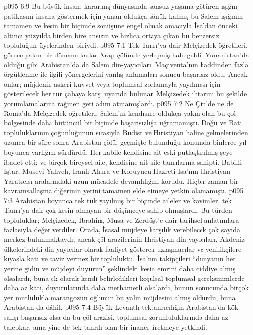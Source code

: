 \vs p095 6:9 Bu büyük insan; kararmış dünyasında sonsuz yaşama götüren ışığın patikasını insana göstermek için yanan oldukça sönük kalmış bu Salem ışığının tamamen ve kesin bir biçimde sönüşüne engel olmak amacıyla İsa’dan önceki altıncı yüzyılda birden bire ansızın ve hızlıca ortaya çıkan bu benzersiz topluluğun üyelerinden biriydi.
\vs p095 7:1 Tek Tanrı’ya dair Melçizedek öğretileri, görece yakın bir döneme kadar Arap çölünde yerleşmiş hale geldi. Yunanistan’da olduğu gibi Arabistan’da da Salem din\hyp{}yayıcıları, Maçiventa’nın haddinden fazla örgütlenme ile ilgili yönergelerini yanlış anlamaları sonucu başarısız oldu. Ancak onlar; müjdenin askeri kuvvet veya toplumsal zorlamayla yayılması için gösterilecek her tür çabaya karşı uyarıda bulunan Melçizedek ihtarını bu şekilde yorumlamalarına rağmen geri adım atmamışlardı.
\vs p095 7:2 Ne Çin’de ne de Roma’da Melçizedek öğretileri, Salem’in kendisine oldukça yakın olan bu çöl bölgesinde daha bütüncül bir biçimde başarısızlığa uğramamıştı. Doğu ve Batı topluluklarının çoğunluğunun sırasıyla Budist ve Hıristiyan haline gelmelerinden uzunca bir süre sonra Arabistan çölü, geçmişte bulunduğu konumda binlerce yıl boyunca varlığını sürdürdü. Her kabile kendisine ait eski putlaştırılmış şeye ibadet etti; ve birçok bireysel aile, kendisine ait aile tanrılarına sahipti. Babilli İştar, Musevi Yahveh, İranlı Ahura ve Koruyucu Hazreti İsa’nın Hıristiyan Yaratıcısı aralarındaki uzun mücadele devamlılığını korudu. Hiçbir zaman bir kavramsallaşma diğerinin yerini tamamen elde etmeye yetkin olamamıştı.
\vs p095 7:3 Arabistan boyunca tek tük yayılmış bir biçimde aileler ve kavimler, tek Tanrı’ya dair çok kesin olmayan bir düşünceye sahip olmuşlardı. Bu türden topluluklar; Melçizedek, İbrahim, Musa ve Zerdüşt’e dair tarihsel anlatımlara fazlasıyla değer verdiler. Orada, İsasal müjdeye karşılık verebilecek çok sayıda merkez bulunmaktaydı; ancak çöl arazilerinin Hıristiyan din\hyp{}yayıcıları, Akdeniz ülkelerindeki din\hyp{}yayıcılar olarak faaliyet gösteren uzlaşmacılar ve yenilikçilere kıyasla katı ve taviz vermez bir topluluktu. İsa’nın takipçileri “dünyanın her yerine gidin ve müjdeyi duyurun” şeklindeki kesin emrini daha ciddiye almış olsalardı, buna ek olarak kendi belirledikleri koşulsal toplumsal gereksinimlerde daha az katı, duyurularında daha merhametli olsalardı, bunun sonucunda birçok yer mutlulukla marangozun oğlunun bu yalın müjdesini almış oldurdu, buna Arabistan da dâhil.
\vs p095 7:4 Büyük Levantlı tektanrıcılığın Arabistan’da kök salışı başarısız olsa da bu çöl arazisi, toplumsal zorunluluklarında daha az talepkar, ama yine de tek\hyp{}tanrılı olan bir inancı üretmeye yetkindi.
